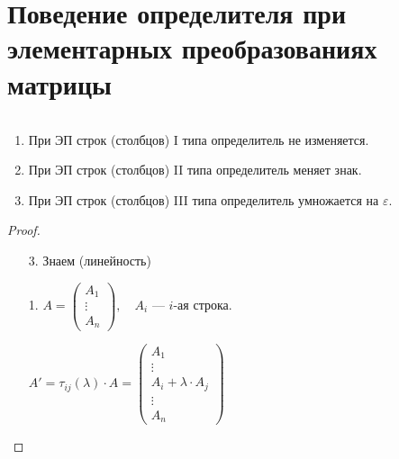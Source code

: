 \section{Поведение определителя при элементарных преобразованиях матрицы}

\begin{theorem-non}
    $\quad$ 
    \begin{enumerate}
        \item При ЭП строк (столбцов) I типа определитель не изменяется.
        \item При ЭП строк (столбцов) II типа определитель меняет знак.
        \item При ЭП строк (столбцов) III типа определитель умножается на $\varepsilon$.
    \end{enumerate}

    \begin{proof} $\quad$ \\
        \begin{enumerate}
            \item[3.] Знаем (линейность)
            \item[1.]
            $A =
            \begin{pmatrix}
                A_1 \\
                \vdots \\
                A_n
            \end{pmatrix}, \quad A_i$ --- $i$-ая строка.
            
            $A' = \tau_{ij}(\lambda) \cdot A = 
            \begin{pmatrix}
                A_1 \\
                \vdots \\
                A_i + \lambda \cdot A_j \\
                \vdots \\
                A_n
            \end{pmatrix}$


\end{enumerate}
\end{proof}
\end{theorem-non}
